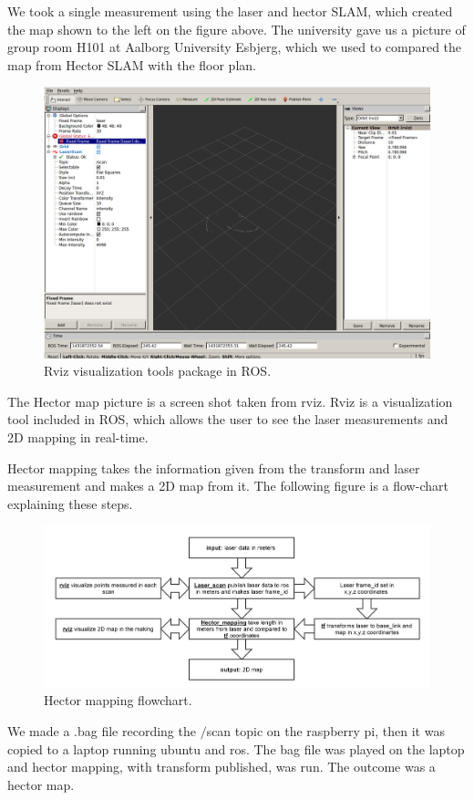 We took a single measurement using the laser and hector SLAM, which created the map shown to the left on the figure above. The university gave us a picture of group room H101 at Aalborg University Esbjerg, which we used to compared the map from Hector SLAM with the floor plan. 

\begin{figure}[H]
	\centering
	\includegraphics[width=.5\linewidth]{images/rviz.png}
	\caption{Rviz visualization tools package in ROS.}
\end{figure}

The Hector map picture is a screen shot taken from rviz. Rviz is a visualization tool included in ROS, which allows the user to see the laser measurements and 2D mapping in real-time.\cite{rviz}

Hector mapping takes the information given from the transform and laser measurement and makes a 2D map from it. The following figure is a flow-chart explaining these steps.

\begin{figure}[H]
	\centering
	\includegraphics[width=1\linewidth]{images/hector_flow.png}
	\caption{Hector mapping flowchart.}
\end{figure}

We made a .bag file recording the $/$scan topic on the raspberry pi, then it was copied to a laptop running ubuntu and ros. The bag file was played on the laptop and hector mapping, with transform published, was run. The outcome was a hector map. 

 
